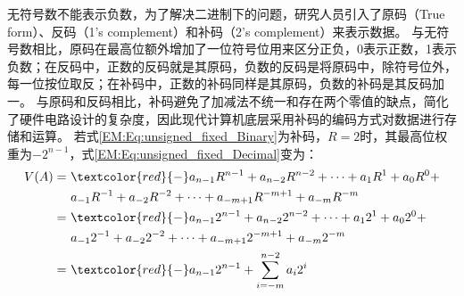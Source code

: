 无符号数不能表示负数，为了解决二进制下的问题，研究人员引入了原码（True form）、反码（1's complement）和补码（2's complement）来表示数据。
与无符号数相比，原码在最高位额外增加了一位符号位用来区分正负，0表示正数，1表示负数；在反码中，正数的反码就是其原码，负数的反码是将原码中，除符号位外，每一位按位取反；在补码中，正数的补码同样是其原码，负数的补码是其反码加一。
与原码和反码相比，补码避免了加减法不统一和存在两个零值的缺点，简化了硬件电路设计的复杂度，因此现代计算机底层采用补码的编码方式对数据进行存储和运算。
若式\eqref{EM:Eq:unsigned_fixed_Binary}为补码，$R=2$时，其最高位权重为$-2^{n-1}$，式\eqref{EM:Eq:unsigned_fixed_Decimal}变为：
\begin{align}
    V(A) = & \ \textcolor{red}{-}a_{n-1}  R^{n-1} + a_{n-2}  R^{n-2} + \cdots + a_1  R^1 + a_0  R^0 + \notag \\
    & \ a_{-1}  R^{-1} + a_{-2}  R^{-2} + \cdots + a_{-m+1}  R^{-m+1} + a_{-m}  R^{-m} \notag \\
    = & \ \textcolor{red}{-}a_{n-1}  2^{n-1} + a_{n-2}  2^{n-2} + \cdots + a_1  2^1 + a_0  2^0 + \notag \\
    & \ a_{-1}  2^{-1} + a_{-2}  2^{-2} + \cdots + a_{-m+1}  2^{-m+1} + a_{-m}  2^{-m} \notag \\
    = & \ \textcolor{red}{-}a_{n-1}  2^{n-1} + \sum_{i=-m}^{n-2} a_i  2^i
\label{EM:Eq:signed_fixed_Decimal}
\end{align}

